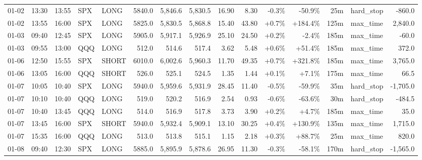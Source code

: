 \documentclass[11pt,a4paper,twoside]{article}
\begin{document}
\begin{landscape}
\begin{center}
\begin{longtable}{>{\color{txtmain}}l l l l l r r r r r r r r >{\color{txtmain}}l r}
01-02 & 13:30 & 13:55 & SPX & LONG & 5840.0 & 5,846.6 & 5,830.5 & 16.90 & 8.30 & \textcolor{lossred}{-0.3\%} & \textcolor{lossred}{-50.9\%} & 25m & hard\_stop & \textcolor{lossred}{-860.0} \\
01-02 & 13:55 & 16:00 & SPX & LONG & 5825.0 & 5,830.5 & 5,868.8 & 15.40 & 43.80 & \textcolor{wingreen}{+0.7\%} & \textcolor{wingreen}{+184.4\%} & 125m & max\_time & \textcolor{wingreen}{2,840.0} \\
01-03 & 09:40 & 12:45 & SPX & LONG & 5905.0 & 5,917.1 & 5,926.9 & 25.10 & 24.50 & \textcolor{wingreen}{+0.2\%} & \textcolor{lossred}{-2.4\%} & 185m & max\_time & \textcolor{lossred}{-60.0} \\
01-03 & 09:55 & 13:00 & QQQ & LONG & 512.0 & 514.6 & 517.4 & 3.62 & 5.48 & \textcolor{wingreen}{+0.6\%} & \textcolor{wingreen}{+51.4\%} & 185m & max\_time & \textcolor{wingreen}{372.0} \\
01-06 & 12:50 & 15:55 & SPX & SHORT & 6010.0 & 6,002.6 & 5,960.3 & 11.70 & 49.35 & \textcolor{wingreen}{+0.7\%} & \textcolor{wingreen}{+321.8\%} & 185m & max\_time & \textcolor{wingreen}{3,765.0} \\
01-06 & 13:05 & 16:00 & QQQ & SHORT & 526.0 & 525.1 & 524.5 & 1.35 & 1.44 & \textcolor{wingreen}{+0.1\%} & \textcolor{wingreen}{+7.1\%} & 175m & max\_time & \textcolor{wingreen}{66.5} \\
01-07 & 10:05 & 10:40 & SPX & LONG & 5940.0 & 5,959.6 & 5,931.9 & 28.45 & 11.40 & \textcolor{lossred}{-0.5\%} & \textcolor{lossred}{-59.9\%} & 35m & hard\_stop & \textcolor{lossred}{-1,705.0} \\
01-07 & 10:10 & 10:40 & QQQ & LONG & 519.0 & 520.2 & 516.9 & 2.54 & 0.93 & \textcolor{lossred}{-0.6\%} & \textcolor{lossred}{-63.6\%} & 30m & hard\_stop & \textcolor{lossred}{-484.5} \\
01-07 & 10:40 & 13:45 & QQQ & LONG & 514.0 & 516.9 & 517.8 & 3.73 & 3.90 & \textcolor{wingreen}{+0.2\%} & \textcolor{wingreen}{+4.7\%} & 185m & max\_time & \textcolor{wingreen}{35.0} \\
01-07 & 13:45 & 16:00 & SPX & SHORT & 5940.0 & 5,932.4 & 5,909.1 & 13.10 & 30.25 & \textcolor{wingreen}{+0.4\%} & \textcolor{wingreen}{+130.9\%} & 135m & max\_time & \textcolor{wingreen}{1,715.0} \\
01-07 & 15:35 & 16:00 & QQQ & LONG & 513.0 & 513.8 & 515.1 & 1.15 & 2.18 & \textcolor{wingreen}{+0.3\%} & \textcolor{wingreen}{+88.7\%} & 25m & max\_time & \textcolor{wingreen}{820.0} \\
01-08 & 09:40 & 12:30 & SPX & LONG & 5885.0 & 5,895.9 & 5,878.6 & 26.95 & 11.30 & \textcolor{lossred}{-0.3\%} & \textcolor{lossred}{-58.1\%} & 170m & hard\_stop & \textcolor{lossred}{-1,565.0} \\

\end{longtable}
\end{center}
\end{landscape}
\end{document}
